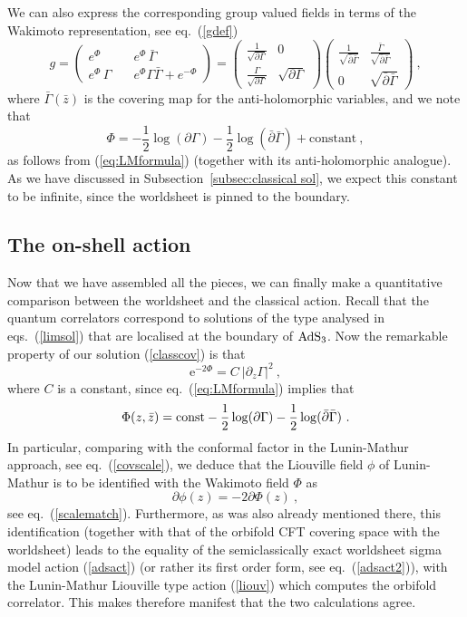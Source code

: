 \documentclass[12pt,a4paper]{article}
\newcommand{\be}{\begin{equation}}
\newcommand{\ee}{\end{equation}}
\begin{document}
We can also express the corresponding group valued fields in terms of the Wakimoto representation, see eq.~(\ref{gdef}) 
\be
g = \left( \begin{matrix} e^{\Phi} \quad &  e^{\Phi}\, \bar{\Gamma} \\ 
 e^{\Phi} \, \Gamma \quad & e^{\Phi} \Gamma \bar{\Gamma} + e^{-\Phi} \end{matrix} \right) 
= \begin{pmatrix}
\frac{1}{\sqrt{\partial \Gamma}} & 0 \\
\frac{\Gamma}{\sqrt{\partial \Gamma}} & \sqrt{\partial \Gamma}
\end{pmatrix}\begin{pmatrix}
\frac{1}{\sqrt{\bar{\partial} \bar\Gamma}} & \frac{\bar\Gamma}{\sqrt{\bar\partial \bar\Gamma}} \\
0 & \sqrt{\bar\partial \bar\Gamma}
\end{pmatrix}\ ,
\ee
where $\bar{\Gamma}(\bar{z})$ is the covering map for the anti-holomorphic variables, and we note that 
\be
\Phi = -\frac{1}{2} \log (\partial\Gamma) - \frac{1}{2} \log (\bar\partial\bar\Gamma) +\text{constant} \ , 
\ee
as follows from (\ref{eq:LMformula}) (together with its anti-holomorphic analogue). As we have discussed in Subsection~\ref{subsec:classical sol}, we expect this constant to be infinite, since the worldsheet is pinned to the boundary. 






\subsection{The on-shell action}\label{sec:onshell}

Now that we have assembled all the pieces, we can finally make a quantitative comparison between the worldsheet and the classical action. Recall that the quantum correlators correspond to solutions of the type analysed in eqs.~(\ref{limsol}) that are localised at the boundary of ${\rm AdS}_3$. Now the remarkable property of our solution (\ref{classcov}) is that 
\be\label{solscale} 
\mathrm{e}^{-2{\Phi}}= C \ \big| \partial_z \Gamma\big|^2 \ ,
\ee
where $C$ is a constant, 
since eq.~(\ref{eq:LMformula}) implies that 
\be
\Phi(z,\bar{z}) = {\rm const} - \frac{1}{2} \log (\partial \Gamma) - \frac{1}{2} \log (\bar{\partial} \bar{\Gamma}) \ . 
\ee
In particular, comparing with the conformal factor in the Lunin-Mathur approach, see eq.~(\ref{covscale}), we deduce that the Liouville field $\phi$ of Lunin-Mathur is to be identified with the Wakimoto field $\Phi$ as 
\be
\partial\phi(z)=-2\partial\Phi(z)\ , 
\ee
see eq.~(\ref{scalematch}). Furthermore, as was also already mentioned there, this identification (together with that of the orbifold CFT covering space with the worldsheet) leads to the equality of the semiclassically exact worldsheet sigma model action (\ref{adsact}) (or rather its first order form, see eq.~(\ref{adsact2})), with the Lunin-Mathur Liouville type action (\ref{liouv}) which computes the orbifold correlator. This makes therefore manifest that the two calculations agree. 
\end{document}
